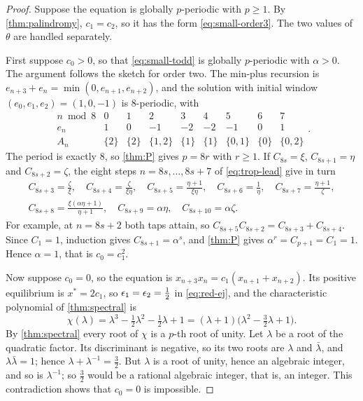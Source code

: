 \begin{proof}
Suppose the equation is globally $p$-periodic with $p\ge1$. By
\autoref{thm:palindromy}, $c_1=c_2$, so it has the form
\eqref{eq:small-order3}. The two values of $\theta$ are handled separately.

First suppose $c_0>0$, so that \eqref{eq:small-todd} is globally
$p$-periodic with $\alpha>0$. The argument follows the sketch for order two. The min-plus
recursion is $e_{n+3}+e_n=\min(0,e_{n+1},e_{n+2})$, and the solution with initial
window $(e_0,e_1,e_2)=(1,0,-1)$ is $8$-periodic, with
\[
\begin{array}{c|cccccccc}
n\bmod8 & 0 & 1 & 2 & 3 & 4 & 5 & 6 & 7\\
\hline
e_n & 1 & 0 & -1 & -2 & -2 & -1 & 0 & 1\\
A_n & \{2\} & \{2\} & \{1,2\} & \{1\} & \{1\} & \{0,1\} & \{0\} & \{0,2\}
\end{array}.
\]
The period is exactly $8$, so \autoref{thm:P} gives $p=8r$ with $r\ge1$. If
$C_{8s}=\xi$, $C_{8s+1}=\eta$ and $C_{8s+2}=\zeta$, the eight steps
$n=8s,\dots,8s+7$ of \eqref{eq:trop-lead} give in turn
\begin{gather*}
C_{8s+3}=\frac{\zeta}{\xi},\quad
C_{8s+4}=\frac{\zeta}{\xi\eta},\quad
C_{8s+5}=\frac{\eta+1}{\xi\eta},\quad
C_{8s+6}=\frac1\eta,\quad
C_{8s+7}=\frac{\eta+1}{\zeta},\\
C_{8s+8}=\frac{\xi(\alpha\eta+1)}{\eta+1},\quad
C_{8s+9}=\alpha\eta,\quad
C_{8s+10}=\alpha\zeta .
\end{gather*}
For example, at $n=8s+2$ both taps attain, so
$C_{8s+5}C_{8s+2}=C_{8s+3}+C_{8s+4}$. Since $C_1=1$, induction gives
$C_{8s+1}=\alpha^s$, and \autoref{thm:P} gives $\alpha^r=C_{p+1}=C_1=1$. Hence
$\alpha=1$, that is $c_0=c_1^2$.

Now suppose $c_0=0$, so the equation is $x_{n+3}x_n=c_1(x_{n+1}+x_{n+2})$.
Its positive equilibrium is $x^*=2c_1$, so $\epsilon_1=\epsilon_2=\tfrac12$ in
\eqref{eq:red-ej}, and the
characteristic polynomial of \autoref{thm:spectral} is
\[
\chi(\lambda)=\lambda^3-\tfrac12\lambda^2-\tfrac12\lambda+1
=(\lambda+1)\bigl(\lambda^2-\tfrac32\lambda+1\bigr).
\]
By \autoref{thm:spectral} every root of $\chi$ is a $p$-th root of unity.
Let $\lambda$ be a root of the quadratic factor. Its discriminant is
negative, so its two roots are $\lambda$ and $\bar\lambda$, and
$\lambda\bar\lambda=1$; hence $\lambda+\lambda^{-1}=\tfrac32$. But $\lambda$
is a root of unity, hence an algebraic integer, and so is $\lambda^{-1}$;
so $\tfrac32$ would be a rational algebraic integer, that is, an integer.
This contradiction shows that $c_0=0$ is impossible.
\end{proof}

